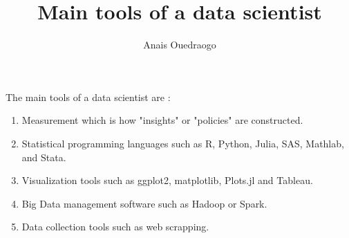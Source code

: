 \documentclass{article}
\title{Main tools of a data scientist}
\author{Anais Ouedraogo}
\begin{document}
\maketitle





The main tools of a data scientist are :


\begin{enumerate}
\item Measurement which is how "insights" or "policies" are constructed.
\item Statistical programming languages such as R, Python, Julia, SAS, Mathlab, and Stata.
\item Visualization tools such as ggplot2, matplotlib, Plots.jl and Tableau.
\item Big Data management software such as Hadoop or Spark.
\item Data collection tools such as web scrapping.
\end{enumerate}
\end{document}
